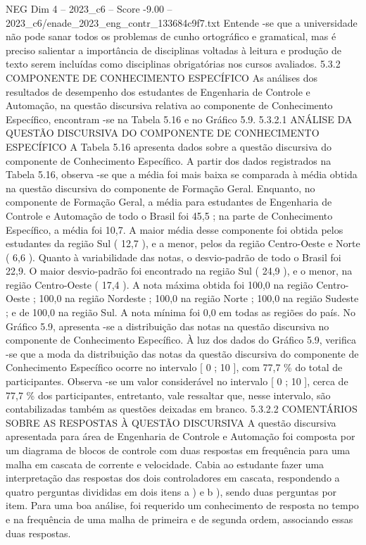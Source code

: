 \begin{textsample}{NEG Dim 4 – 2023\_c6 – Score -9.00 – 2023\_c6/enade\_2023\_eng\_contr\_133684c9f7.txt}
Entende -se que a universidade não pode sanar todos os problemas de cunho ortográfico e gramatical, mas é preciso salientar a importância de disciplinas voltadas à leitura e produção de texto serem incluídas como disciplinas obrigatórias nos cursos avaliados. 5.3.2 COMPONENTE DE CONHECIMENTO ESPECÍFICO As análises dos resultados de desempenho dos estudantes de Engenharia de Controle e Automação, na questão discursiva relativa ao componente de Conhecimento Específico, encontram -se na Tabela 5.16 e no Gráfico 5.9. 5.3.2.1 ANÁLISE DA QUESTÃO DISCURSIVA DO COMPONENTE DE CONHECIMENTO ESPECÍFICO A Tabela 5.16 apresenta dados sobre a questão discursiva do componente de Conhecimento Específico.
A partir dos dados registrados na Tabela 5.16, observa -se que a média foi mais baixa se comparada à média obtida na questão discursiva do componente de Formação Geral.
Enquanto, no componente de Formação Geral, a média para estudantes de Engenharia de Controle e Automação de todo o Brasil foi 45,5 ; na parte de Conhecimento Específico, a média foi 10,7.
A maior média desse componente foi obtida pelos estudantes da região Sul ( 12,7 ), e a menor, pelos da região Centro-Oeste e Norte ( 6,6 ).
Quanto à variabilidade das notas, o desvio-padrão de todo o Brasil foi 22,9.
O maior desvio-padrão foi encontrado na região Sul ( 24,9 ), e o menor, na região Centro-Oeste ( 17,4 ).
A nota máxima obtida foi 100,0 na região Centro-Oeste ; 100,0 na região Nordeste ; 100,0 na região Norte ; 100,0 na região Sudeste ; e de 100,0 na região Sul.
A nota mínima foi 0,0 em todas as regiões do país.
No Gráfico 5.9, apresenta -se a distribuição das notas na questão discursiva no componente de Conhecimento Específico.
À luz dos dados do Gráfico 5.9, verifica -se que a moda da distribuição das notas da questão discursiva do componente de Conhecimento Específico ocorre no intervalo [ 0 ; 10 ], com 77,7 \% do total de participantes.
Observa -se um valor considerável no intervalo [ 0 ; 10 ], cerca de 77,7 \% dos participantes, entretanto, vale ressaltar que, nesse intervalo, são contabilizadas também as questões deixadas em branco. 5.3.2.2 COMENTÁRIOS SOBRE AS RESPOSTAS À QUESTÃO DISCURSIVA A questão discursiva apresentada para área de Engenharia de Controle e Automação foi composta por um diagrama de blocos de controle com duas respostas em frequência para uma malha em cascata de corrente e velocidade.
Cabia ao estudante fazer uma interpretação das respostas dos dois controladores em cascata, respondendo a quatro perguntas divididas em dois itens a ) e b ), sendo duas perguntas por item.
Para uma boa análise, foi requerido um conhecimento de resposta no tempo e na frequência de uma malha de primeira e de segunda ordem, associando essas duas respostas.

\end{textsample}
